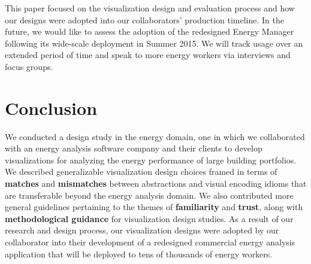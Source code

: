 \documentclass[journal]{vgtc}                %
\newcommand{\tm}[1]{\textcolor{red}{#1}}
\begin{document}

This paper focused on the visualization design and evaluation process and how our designs were adopted into our collaborators' production timeline.
In the future, we would like to assess the adoption of the redesigned Energy Manager following its wide-scale deployment in Summer 2015. 
We will track usage over an extended period of time and speak to more energy workers via interviews and focus groups.


\section{Conclusion}
\label{conclusion}


We conducted a design study in the energy domain, one in which we collaborated with an energy analysis software company and their clients to develop visualizations for analyzing the energy performance of large building portfolios.
We described generalizable visualization design choices framed in terms of {\bf matches} and {\bf mismatches} between abstractions and visual encoding idioms that are transferable beyond the energy analysis domain.
We also contributed more general guidelines pertaining to the themes of {\bf familiarity} and {\bf trust}, along with {\bf methodological guidance} for visualization design studies. %
As a result of our research and design process, our visualization designs were adopted by our collaborator into their development of a redesigned commercial energy analysis application that will be deployed to tens of thousands of energy workers.





\end{document}
